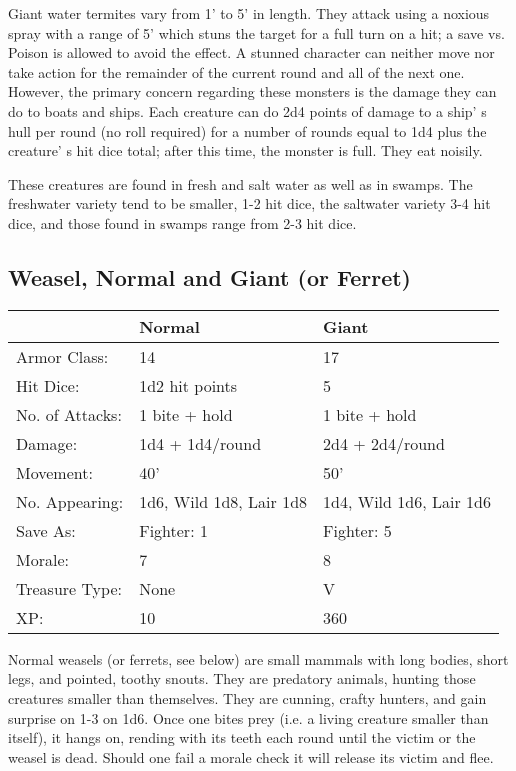 \documentclass[a4paper,twoside,openany,10pt]{book}
\begin{document}
\begin{multicols}{2}
Giant water termites vary from 1' to 5' in length. They attack using a noxious spray with a range of 5' which stuns the target for a full turn on a hit; a save vs. Poison is allowed to avoid the effect. A stunned character can neither move nor take action for the remainder of the current round and all of the next one.  However, the primary concern regarding these monsters is the damage they can do to boats and ships. Each creature can do 2d4 points of damage to a ship' s hull per round (no roll required) for a number of rounds equal to 1d4 plus the creature' s hit dice total; after this time, the monster is full. They eat noisily.

These creatures are found in fresh and salt water as well as in swamps. The freshwater variety tend to be smaller, 1-2 hit dice, the saltwater variety 3-4 hit dice, and those found in swamps range from 2-3 hit dice.

\subsection*{Weasel, Normal and Giant (or Ferret)}\label{weasel-normal-and-giant-or-ferret}

\begin{tabularx}{0.50\textwidth}{@{}lXX@{}}
& Normal & Giant \\\hline
Armor Class: & 14 & 17 \\\hline
Hit Dice: & 1d2 hit points & 5 \\\hline
No. of Attacks: & 1 bite + hold & 1 bite + hold \\\hline
Damage: & 1d4 + 1d4/round & 2d4 + 2d4/round \\\hline
Movement: & 40' & 50' \\\hline
No. Appearing: & 1d6, Wild 1d8, Lair 1d8 & 1d4, Wild 1d6, Lair 1d6 \\\hline
Save As: & Fighter: 1 & Fighter: 5 \\\hline
Morale: & 7 & 8 \\\hline
Treasure Type: & None & V \\\hline
XP: & 10 & 360 \\\hline
\end{tabularx}\medskip

Normal weasels (or ferrets, see below) are small mammals with long bodies, short legs, and pointed, toothy snouts. They are predatory animals, hunting those creatures smaller than themselves. They are cunning, crafty hunters, and gain surprise on 1-3 on 1d6. Once one bites prey (i.e. a living creature smaller than itself), it hangs on, rending with its teeth each round until the victim or the weasel is dead. Should  one fail a morale check it will release its victim and flee.


\end{multicols}
\end{document}
